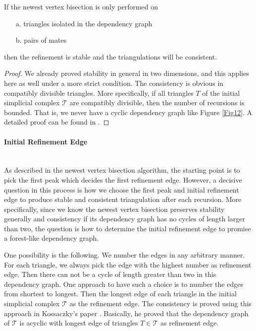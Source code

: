    \begin{lemma}
    If the newest vertex bisection is only performed on 
    \begin{itemize}
        \item[a. ] triangles isolated in the dependency graph
        \item[b. ] pairs of mates
      \end{itemize}
    then the refinement is stable and the triangulations will be consistent.
    \label{lma8}
    \end{lemma}
    \begin{proof}
    We already proved stability in general in two dimensions, and this applies here as well under a more strict condition. The consistency is obvious in compatibly divisible triangles. More specifically, if all triangles $T$ of the initial simplicial complex $\mathcal T$ are compatibly divisible, then the number of recursions is bounded. That is, we never have a cyclic dependency graph like Figure \ref{Fig12}. A detailed proof can be found in \cite{mitchell1988unified, mitchell1991adaptive}.
    \end{proof}

    \paragraph{Initial Refinement Edge}\mbox{}\\
    As described in the newest vertex bisection algorithm, the starting point is to pick the first peak which decides the first refinement edge. However, a decisive question in this process is how we choose the first peak and initial refinement edge to produce stable and consistent triangulation after each recursion. More specifically, since we know the newest vertex bisection preserves stability generally and consistency if its dependency graph has no cycles of length larger than two, the question is how to determine the initial refinement edge to promise a forest-like dependency graph. 

    One possibility is the following.
    We number the edges in any arbitrary manner. For each triangle, we always pick the edge with the highest number as refinement edge. Then there can not be a cycle of length greater than two in this dependency graph.
    One approach to have such a choice is to number the edges from shortest to longest.
    Then the longest edge of each triangle in the initial simplicial complex $\mathcal T$ as the refinement edge. The consistency is proved using this approach in Kossaczky's paper \cite{kossaczky1994recursive}. Basically, he proved that the dependency graph of $\mathcal T$ is acyclic with longest edge of triangles $T\in\mathcal T$ as refinement edge.

